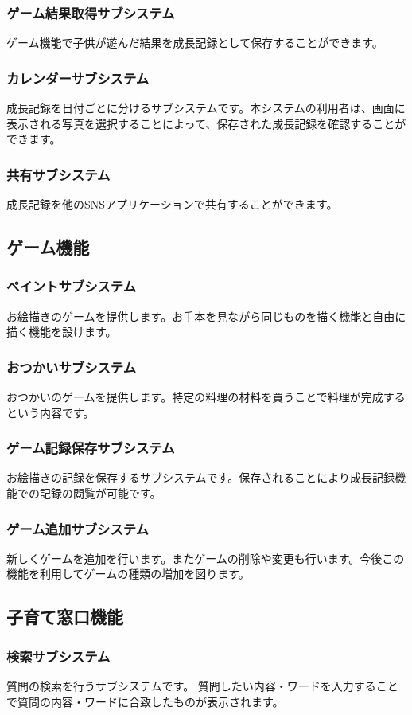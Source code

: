 \documentclass[a4j]{jarticle}
\begin{document}
\subsubsection*{ゲーム結果取得サブシステム}
ゲーム機能で子供が遊んだ結果を成長記録として保存することができます。
\subsubsection*{カレンダーサブシステム}
成長記録を日付ごとに分けるサブシステムです。本システムの利用者は、画面に表示される写真を選択することによって、保存された成長記録を確認することができます。
\subsubsection*{共有サブシステム}
成長記録を他のSNSアプリケーションで共有することができます。

\subsection{ゲーム機能}
\subsubsection*{ペイントサブシステム}
お絵描きのゲームを提供します。お手本を見ながら同じものを描く機能と自由に描く機能を設けます。
\subsubsection*{おつかいサブシステム}
おつかいのゲームを提供します。特定の料理の材料を買うことで料理が完成するという内容です。
\subsubsection*{ゲーム記録保存サブシステム}
お絵描きの記録を保存するサブシステムです。保存されることにより成長記録機能での記録の閲覧が可能です。
\subsubsection*{ゲーム追加サブシステム}
新しくゲームを追加を行います。またゲームの削除や変更も行います。今後この機能を利用してゲームの種類の増加を図ります。

\subsection{子育て窓口機能}
\subsubsection*{検索サブシステム}
質問の検索を行うサブシステムです。 質問したい内容・ワードを入力することで質問の内容・ワードに合致したものが表示されます。
\end{document}
